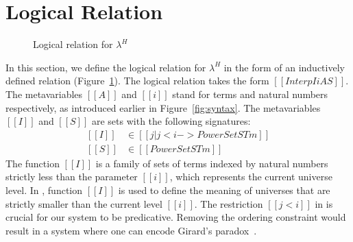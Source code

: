 \documentclass[acmsmall]{acmart}
\newcommand{\lang}{$\lambda^H$\xspace}
\begin{document}














\section{Logical Relation}
\label{sec:logreldep}
\begin{figure}[h]
\caption{Logical relation for \lang}
\label{fig:logrel}
\end{figure}
In this section, we define the logical relation for \lang{} in the
form of an inductively defined relation (Figure~\ref{fig:logrel}). The
logical relation takes the form $[[Interp I i A S]]$. The
metavariables $[[A]]$ and $[[i]]$ stand for terms and natural
numbers respectively, as introduced earlier in
Figure~\ref{fig:syntax}.
The metavariables $[[I]]$ and $[[S]]$ are
sets with the following signatures:
\begin{equation*}
  \begin{split}
    [[I]] &\in [[ { j | j < i  } ->  PowerSet STm ]] \\
    [[S]] &\in [[PowerSet STm]]
  \end{split}
\end{equation*}
The function $[[I]]$ is a family of sets of terms indexed by
natural numbers strictly less than the parameter $[[i]]$, which
represents the current universe level.  In , function
$[[I]]$ is used to define the meaning of
universes that are strictly smaller than the current level $[[i]]$. The
restriction $[[j < i]]$ in  is crucial for our system to
be predicative. Removing the ordering constraint would result in a
system where one can encode Girard's paradox~\citep{girard-thesis}.
\end{document}
